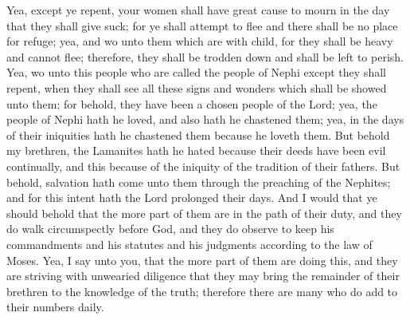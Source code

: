 Yea, except ye repent, your women shall have great cause to mourn in the day that they shall give suck; for ye shall attempt to flee and there shall be no place for refuge; yea, and wo unto them which are with child, for they shall be heavy and cannot flee; therefore, they shall be trodden down and shall be left to perish.
\bverse \iffalse Yea, wo unto this people who are called the people of Nephi except they shall repent, when they shall see all these signs and wonders which shall be showed unto them; for behold, they have been a chosen people of the Lord; yea, the people of Nephi hath he loved, and also hath he chastened them; yea, in the days of their iniquities hath he chastened them because he loveth them. \fi
Yea, wo unto this people who are called the people of Nephi except they shall repent, when they shall see all these signs and wonders which shall be showed unto them; for behold, they have been a chosen people of the Lord; yea, the people of Nephi hath he loved, and also hath he chastened them; yea, in the days of their iniquities hath he chastened them because he loveth them.
\bverse \iffalse But behold my brethren, the Lamanites hath he hated because their deeds have been evil continually, and this because of the iniquity of the tradition of their fathers. But behold, salvation hath come unto them through the preaching of the Nephites; and for this intent hath the Lord prolonged their days. \fi
But behold my brethren, the Lamanites hath he hated because their deeds have been evil continually, and this because of the iniquity of the tradition of their fathers. But behold, salvation hath come unto them through the preaching of the Nephites; and for this intent hath the Lord prolonged their days.
\bverse \iffalse And I would that ye should behold that the more part of them are in the path of their duty, and they do walk circumspectly before God, and they do observe to keep his commandments and his statutes and his judgments according to the law of Moses. \fi
And I would that ye should behold that the more part of them are in the path of their duty, and they do walk circumspectly before God, and they do observe to keep his commandments and his statutes and his judgments according to the law of Moses.
\bverse \iffalse Yea, I say unto you, that the more part of them are doing this, and they are striving with unwearied diligence that they may bring the remainder of their brethren to the knowledge of the truth; therefore there are many who do add to their numbers daily. \fi
Yea, I say unto you, that the more part of them are doing this, and they are striving with unwearied diligence that they may bring the remainder of their brethren to the knowledge of the truth; therefore there are many who do add to their numbers daily.
